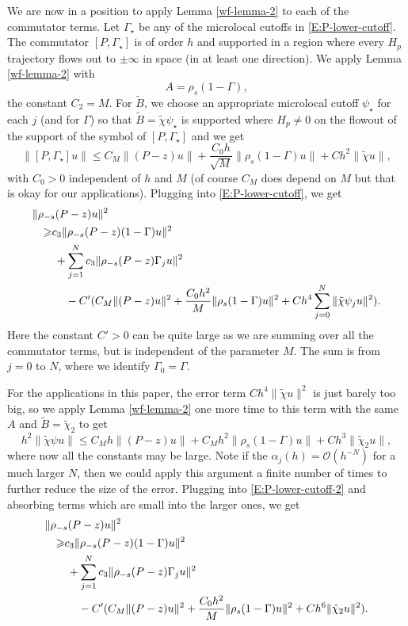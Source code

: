 \documentclass[twoside, final]{amsart}
\theoremstyle{definition}
\numberwithin{equation}{section}
\begin{document}
We are now in a position to apply Lemma \ref{wf-lemma-2} to each of
the commutator terms.  Let $\Gamma_\star$ be any of the microlocal
cutoffs in \eqref{E:P-lower-cutoff}.  The commutator $[P , \Gamma_\star]$
is of order $h$ and supported in a region where every $H_p$ trajectory
flows out to $\pm \infty$ in space (in at least one direction).  We
apply Lemma \ref{wf-lemma-2} with 
\[
A = \rho_{s}(1 - \Gamma),
\]
the constant $C_2 = M$.  For ${\tilde{B}}$, we choose an appropriate
microlocal 
cutoff $\psi_\star$ for each $j$ (and for $\Gamma$) so that ${\tilde{B}} = {\tilde{\chi}} \psi_\star$ is supported
where $H_p \neq 0$ on the flowout of the support of the symbol of
$[P, \Gamma_\star]$ and we get
\[
\| [P , \Gamma_\star] u \| {\leqslant} C_M \| (P-z) u \| +
\frac{C_0 h}{\sqrt{M}} \| \rho_{s}(1 - \Gamma) u \| + C h^2 \| {\tilde{\chi}}
u \|,
\]
with $C_0>0$ independent of $h$ and $M$ (of course $C_M$ does depend
on $M$ but that is okay for our applications).  Plugging into
\eqref{E:P-lower-cutoff}, we get
\begin{align}
& \| \rho_{-s} (P-z) u \|^2 \notag \\
& \quad {\geqslant} c_3\| \rho_{-s} (P-z) (1 -
\Gamma)  u \|^2 \notag \\
& \quad \quad + \sum_{j = 1}^N  c_3\| \rho_{-s} (P-z) 
\Gamma_j  u \|^2 \notag \\
& \quad \quad \quad -C'  ( C_M \| (P-z) u \|^2 +
\frac{C_0 h^2}{{M}} \| \rho_{s}(1 - \Gamma) u \|^2 + C h^4 \sum_{j =
  0}^N \| {\tilde{\chi}} \psi_j
u \|^2) . \label{E:P-lower-cutoff-2}
\end{align}
Here the constant $C'>0$ can be quite large as we are summing over all
the commutator terms, but is independent of the parameter $M$.  The sum is from $j = 0$ to $N$, where we
identify $\Gamma_0 = \Gamma$.

For the applications in this paper, the error term $ C h^4 \| {\tilde{\chi}}
u \|^2$ is just barely too big, so we apply Lemma \ref{wf-lemma-2} one
more time to this term with the same $A$ and ${\tilde{B}} = {\tilde{\chi}}_2$ to get
\[
h^2\| {\tilde{\chi}} \psi u \| {\leqslant} C_M h\| (P-z) u \| + C_M h^2 \| \rho_{s}
(1-\Gamma) u \| + C h^3 \| {\tilde{\chi}}_2 u \|,
\]
where now all the constants may be large.  Note if the $\alpha_j(h) =
{{\mathcal O}}(h^{-N})$ for a much larger $N$, then we could apply this argument a
finite number of times to further reduce the size of the error.
Plugging into \eqref{E:P-lower-cutoff-2} and absorbing terms which are
small into the larger ones, we get
\begin{align*}
& \| \rho_{-s} (P-z) u \|^2 \notag \\
& \quad {\geqslant} c_3\| \rho_{-s} (P-z) (1 -
\Gamma)  u \|^2 \notag \\
& \quad \quad + \sum_{j = 1}^N  c_3\| \rho_{-s} (P-z) 
\Gamma_j  u \|^2 \notag \\
& \quad \quad \quad -C'  ( C_M \| (P-z) u \|^2 +
\frac{C_0 h^2}{{M}} \| \rho_{s}(1 - \Gamma) u \|^2 + C h^6  \| {\tilde{\chi}}_2
u \|^2) .
\end{align*}
\end{document}

